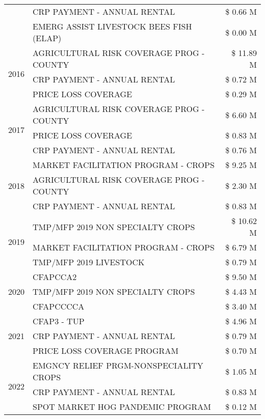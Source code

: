 \begin{tabular}{llr}
 & CRP PAYMENT - ANNUAL RENTAL & \$ 0.66 M \\
 & EMERG ASSIST LIVESTOCK BEES FISH (ELAP) & \$ 0.00 M \\
\cline{1-3}
\multirow[t]{3}{*}{2016} & AGRICULTURAL RISK COVERAGE PROG - COUNTY & \$ 11.89 M \\
 & CRP PAYMENT - ANNUAL RENTAL & \$ 0.72 M \\
 & PRICE LOSS COVERAGE & \$ 0.29 M \\
\cline{1-3}
\multirow[t]{3}{*}{2017} & AGRICULTURAL RISK COVERAGE PROG - COUNTY & \$ 6.60 M \\
 & PRICE LOSS COVERAGE & \$ 0.83 M \\
 & CRP PAYMENT - ANNUAL RENTAL & \$ 0.76 M \\
\cline{1-3}
\multirow[t]{3}{*}{2018} & MARKET FACILITATION PROGRAM - CROPS & \$ 9.25 M \\
 & AGRICULTURAL RISK COVERAGE PROG - COUNTY & \$ 2.30 M \\
 & CRP PAYMENT - ANNUAL RENTAL & \$ 0.83 M \\
\cline{1-3}
\multirow[t]{3}{*}{2019} & TMP/MFP 2019 NON SPECIALTY CROPS & \$ 10.62 M \\
 & MARKET FACILITATION PROGRAM - CROPS & \$ 6.79 M \\
 & TMP/MFP 2019 LIVESTOCK & \$ 0.79 M \\
\cline{1-3}
\multirow[t]{3}{*}{2020} & CFAPCCA2 & \$ 9.50 M \\
 & TMP/MFP 2019 NON SPECIALTY CROPS & \$ 4.43 M \\
 & CFAPCCCCA & \$ 3.40 M \\
\cline{1-3}
\multirow[t]{3}{*}{2021} & CFAP3 - TUP & \$ 4.96 M \\
 & CRP PAYMENT - ANNUAL RENTAL & \$ 0.79 M \\
 & PRICE LOSS COVERAGE PROGRAM & \$ 0.70 M \\
\cline{1-3}
\multirow[t]{3}{*}{2022} & EMGNCY RELIEF PRGM-NONSPECIALITY CROPS & \$ 1.05 M \\
 & CRP PAYMENT - ANNUAL RENTAL & \$ 0.83 M \\
 & SPOT MARKET HOG PANDEMIC PROGRAM & \$ 0.12 M \\
\cline{1-3}
\bottomrule
\end{tabular}
